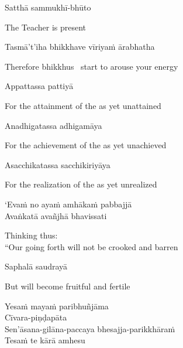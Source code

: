Satthā sammukhī-bhūto

\begin{english}
  The Teacher is present
\end{english}

Tasmā't'iha bhikkhave vīriyaṁ ārabhatha

\begin{english}
  Therefore bhikkhus \breathmark\ start to arouse your energy
\end{english}

Appattassa pattiyā

\begin{english}
  For the attainment of the as yet unattained
\end{english}

Anadhigatassa adhigamāya

\begin{english}
  For the achievement of the as yet unachieved
\end{english}

Asacchikatassa sacchikiriyāya

\begin{english}
  For the realization of the as yet unrealized
\end{english}

`Evaṁ no ayaṁ amhākaṁ pabbajjā\\
Avaṅkatā avañjhā\makeatletter\hyperlink{endnote90-appendix}\makeatother \thinspace
bhavissati

\begin{english}
  Thinking thus:\\
  ``Our going forth will not be crooked and barren\makeatletter\hyperlink{endnote91-appendix}\makeatother
\end{english}

Saphalā saudrayā

\begin{english}
  But will become fruitful and fertile
\end{english}

Yesaṁ mayaṁ paribhuñjāma\\
Cīvara-piṇḍapāta\\
Sen'āsana-gilāna-paccaya bhesajja-parikkhāraṁ\\
Tesaṁ te kārā amhesu

